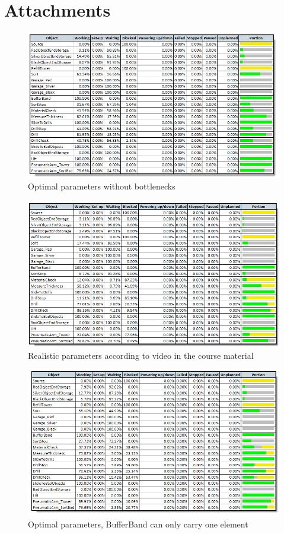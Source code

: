 \documentclass{report}
\begin{document}
\section{Attachments}
\begin{figure}[h!]
	\includegraphics[width=\textwidth]{figures/stat-optimal.png}
	\caption{Optimal parameters without bottlenecks}
	\label{fig:stat-optimal}
\end{figure}
\begin{figure}[h!]
	\includegraphics[width=\textwidth]{figures/stat-realistic.png}
	\caption{Realistic parameters according to video in the course material}
	\label{fig:stat-realistic}
\end{figure}
\begin{figure}[h!]
	\includegraphics[width=\textwidth]{figures/stat-optimal-low-buf.png}
	\caption{Optimal parameters, BufferBand can only carry one element}
	\label{fig:stat-optimal-low-buf}
\end{figure}
\end{document}
